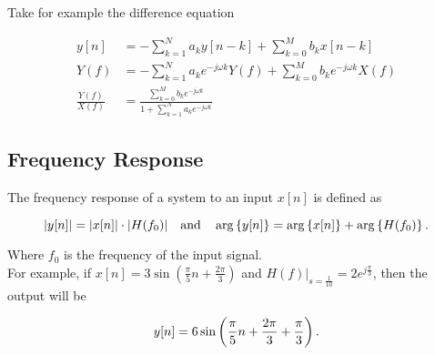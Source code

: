 \documentclass{report}
\begin{document}
Take for example the difference equation

\begin{align*}
	y[n]              & = - \sum_{k=1}^{N} a_k y[n-k] + \sum_{k=0}^{M} b_k x[n-k]                         \\
	Y(f)              & = - \sum_{k=1}^{N} a_k e^{-j\omega k}Y(f) + \sum_{k=0}^{M} b_k e^{-j\omega k}X(f) \\
	\frac{Y(f)}{X(f)} & = \frac{\sum_{k=0}^{M} b_k e^{-j\omega k}}{1 + \sum_{k=1}^{N} a_k e^{-j\omega k}}
\end{align*}

\subsection{Frequency Response}

The frequency response of a system to an input $x[n]$ is defined as

\[
	|y[n]| = |x[n]| \cdot |H(f_0)| \qand \arg\lt\{ y[n] \rt\} = \arg\lt\{ x[n] \rt\} + \arg\lt\{ H(f_0) \rt\}
	.\]

Where $f_0$ is the frequency of the input signal.\\

For example, if $x[n] = 3 \sin(\frac{\pi}{5}n + \frac{2\pi}3)$ and $H(f)|_{s=\frac{1}{10}} = 2e^{j\frac{\pi}{3}}$, then the output will be

\[
	y[n] = 6 \sin\left( \frac{\pi}{5}n + \frac{2\pi}{3} + \frac{\pi}{3} \right)
	.\]

\end{document}
